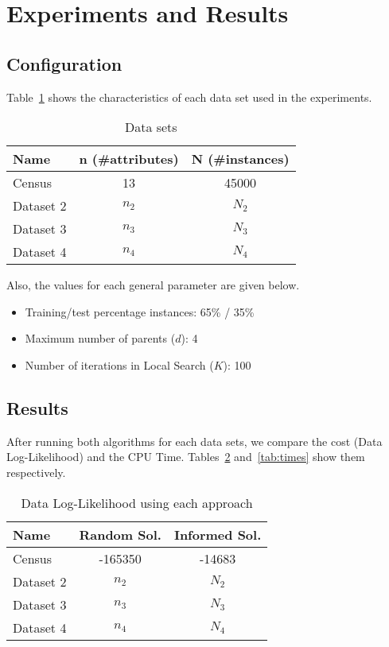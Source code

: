 \section{Experiments and Results}
\label{sec:experiments}


\subsection{Configuration}
\label{subsec:configuration}
	Table~\ref{tab:datasets} shows the characteristics of each data set used in the experiments.
	\begin{table}[ h ]
		\centering
		\begin{tabular}{ | l | c | c | }
			\hline
			Name & n (\#attributes) & N (\#instances) \\ \hline
			Census & 13 & 45000 \\ \hline
			Dataset 2 & $n_2$ & $N_2$ \\ \hline
			Dataset 3 & $n_3$ & $N_3$ \\ \hline
			Dataset 4 & $n_4$ & $N_4$ \\ \hline
		\end{tabular}
		\caption{Data sets}
		\label{tab:datasets}
	\end{table}
	
	Also, the values for each general parameter are given below.
	\begin{itemize}
		\item Training/test percentage instances: 65\% / 35\%
		\item Maximum number of parents ($d$): 4
		\item Number of iterations in Local Search ($K$): 100
	\end{itemize}

\subsection{Results}
\label{subsec:results}
	After running both algorithms for each data sets, we compare the cost (Data Log-Likelihood) and the CPU Time. Tables~\ref{tab:costs} and~\ref{tab:times} show them respectively.
	\begin{table}[ h ]
		\centering
		\begin{tabular}{ | l | c | c | }
			\hline
			Name & Random Sol. & Informed Sol. \\ \hline
			Census & -165350 & -14683 \\ \hline
			Dataset 2 & $n_2$ & $N_2$ \\ \hline
			Dataset 3 & $n_3$ & $N_3$ \\ \hline
			Dataset 4 & $n_4$ & $N_4$ \\ \hline
		\end{tabular}
		\caption{Data Log-Likelihood using each approach}
		\label{tab:costs}
	\end{table}
	
